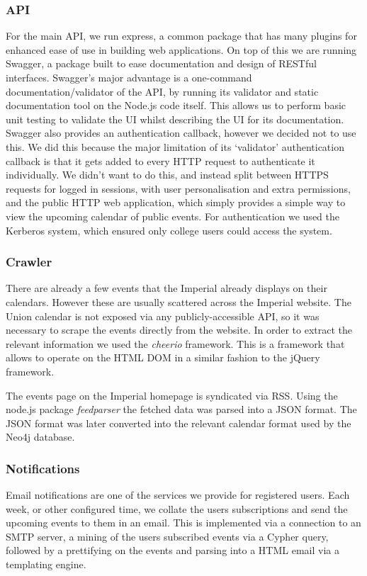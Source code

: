 \documentclass[11pt]{article}
\let\footnote=\endnote
\begin{document}
\subsubsection {API}
For the main API, we run express\footnote{express.js}, a common package that has many plugins for enhanced ease of use in building web applications. On top of this we are running Swagger, a package built to ease documentation and design of RESTful interfaces. Swagger's major advantage is a one-command documentation/validator of the API, by running its validator and static documentation tool\footnote{https://github.com/wordnik/swagger-codegen} on the Node.js code itself. This allows us to perform basic unit testing to validate the UI whilst describing the UI for its documentation.
Swagger also provides an authentication callback, however we decided not to use this. We did this because the major limitation of its `validator' authentication callback is that it gets added to every HTTP request to authenticate it individually. We didn't want to do this, and instead split between HTTPS requests for logged in sessions, with user personalisation and extra permissions, and the public HTTP web application, which simply provides a simple way to view the upcoming calendar of public events. For authentication we used the Kerberos system, which ensured only college users could access the system.

\subsubsection {Crawler}

There are already a few events that the Imperial already displays on their calendars. However these are usually scattered across the Imperial website.
The Union calendar is not exposed via any publicly-accessible API, so it was necessary to scrape the events directly from the website.
In order to extract the relevant information we used the \textit{cheerio} framework. This is a framework that allows to operate on the HTML DOM in a similar fashion to the jQuery framework.

The events page on the Imperial homepage is syndicated via RSS. Using the node.js package \textit{feedparser} the fetched data was parsed into a JSON format. The JSON format was later converted into the relevant calendar format used by the Neo4j database.

\subsubsection{Notifications}
Email notifications are one of the services we provide for registered users. Each week, or other configured time, we collate the users subscriptions and send the upcoming events to them in an email. This is implemented via a connection to an SMTP server, a mining of the users subscribed events via a Cypher query, followed by a prettifying on the events and parsing into a HTML email via a templating engine.
\end{document}
